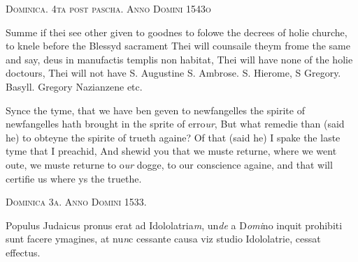 \documentclass[12pt, a4paper]{book}
\begin{document}
 

               
                  
				\begin{center}  {\scshape Dominica. 4ta post pascha. Anno Domini 1543o}  \end{center}
			

				\marginpar[\vspace{0.5cm}{\textcolor{Gray}{sclanderous}}]{}
			
		\ifthenelse{\isodd{\thepage}}
		{\reversemarginpar}
		{\normalmarginpar}
		Summe if thei see other given to goodnes to folowe the decrees
 of holie churche, to knele before the Blessyd sacrament
 Thei will counsaile theym frome the same and say, deus
 in manufactis templis non habitat, Thei will have none
 of the holie doctours, Thei will not have S. Augustine
 S. Ambrose. S. Hierome, S Gregory. Basyll. Gregory
 Nazianzene etc.

	
				\marginpar[\vspace{0.5cm}{\textcolor{Gray}{n}}]{}
			
	
		\ifthenelse{\isodd{\thepage}}
		{\reversemarginpar}
		{\normalmarginpar}
		Synce the tyme, that we have ben geven to newfangelles
 the spirite of newfangelles hath brought in the sprite of
 erro\textit{ur}, But what remedie than (said he) to obteyne the
 spirite of trueth againe? Of that (said he) I spake the
 laste tyme that I preachid, And shewid you that we muste
 returne, where we went oute, we muste returne to o\textit{ur }dogge,
 to our conscience againe, and that will certifie us where
 ys the truethe.

 

               
                  
				\begin{center}  {\scshape Dominica 3a. Anno Domini 1533.
                  }  \end{center}
			

 
		\ifthenelse{\isodd{\thepage}}
		{\reversemarginpar}
		{\normalmarginpar}
		Populus Judaicus pronus erat ad Idololatria\textit{m}, un\textit{de} a D\textit{omi}no
 inquit prohibiti sunt facere ymagines, at nu\textit{n}c cessante causa
 viz studio Idololatrie, cessat effectus.
 


            
            
\dotfill
					  \subsection*{}
\end{document}

